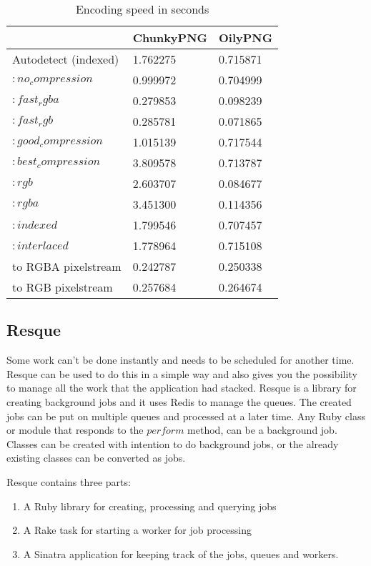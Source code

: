 \begin{table}[ht!]
\centering
\caption{Encoding speed in seconds}
{
\renewcommand{\arraystretch}{1.25}
\begin{tabular}{ lll }
                        & ChunkyPNG   &   OilyPNG \\ \hline
Autodetect (indexed)    & 1.762275    & 0.715871 \\
$:no_compression$       & 0.999972    & 0.704999 \\
$:fast_rgba$            & 0.279853    & 0.098239 \\
$:fast_rgb$             & 0.285781    & 0.071865 \\
$:good_compression$     & 1.015139    & 0.717544 \\
$:best_compression$     & 3.809578    & 0.713787 \\
$:rgb$                  & 2.603707    & 0.084677 \\
$:rgba$                 & 3.451300    & 0.114356 \\
$:indexed$              & 1.799546    & 0.707457 \\
$:interlaced$           & 1.778964    & 0.715108 \\
to RGBA pixelstream     & 0.242787    & 0.250338 \\
to RGB pixelstream      & 0.257684    & 0.264674 \\
\end{tabular}
}
\label{encoding_speed}
\end{table}



\subsection{Resque}
Some work can't be done instantly and needs to be scheduled for another time. Resque can be used to do this in a simple way and also gives you the possibility to manage all the work that the application had stacked.
Resque is a library for creating background jobs and it uses Redis to manage the queues. The created jobs can be put on multiple queues and processed at a later time.
Any Ruby class or module that responds to the $perform$ method, can be a background job. Classes can be created with intention to do background jobs, or the already existing classes can be converted as jobs.

Resque contains three parts:

\begin{enumerate}
  \item A Ruby library for creating, processing and querying jobs
  \item A Rake task for starting a worker for job processing
  \item A Sinatra application for keeping track of the jobs, queues and workers.
\end{enumerate}


